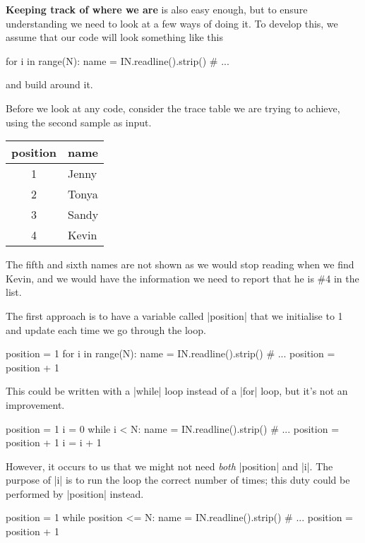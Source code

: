 \textbf{Keeping track of where we are} is also easy enough, but to ensure understanding we
need to look at a few ways of doing it. To develop this, we assume that our code will look
something like this
\begin{pythoncode}
  for i in range(N):
    name = IN.readline().strip()
    # ...
\end{pythoncode}
and build around it.

Before we look at any code, consider the trace table we are trying to achieve, using the
second sample as input.

\begin{inlinetable}
  \begin{tabular}{cl}
    \toprule
    position & name  \\
    \midrule
    1        & Jenny \\
    2        & Tonya \\
    3        & Sandy \\
    4        & Kevin \\
    \bottomrule
  \end{tabular}
\end{inlinetable}
\medskip

The fifth and sixth names are not shown as we would stop reading when we find
Kevin, and we would have the information we need to report that he is \#4 in the list.

The first approach is to have a variable called \pycode|position| that we initialise to 1
and update each time we go through the loop.
\begin{pythoncode}
  position = 1
  for i in range(N):
    name = IN.readline().strip()
    # ...
    position = position + 1
\end{pythoncode}

This could be written with a \pycode|while| loop instead of a \pycode|for| loop, but it's
not an improvement.

\begin{pythoncode}
  position = 1
  i = 0
  while i < N:
    name = IN.readline().strip()
    # ...
    position = position + 1
    i = i + 1
\end{pythoncode}

However, it occurs to us that we might not need \emph{both} \pycode|position| and
\pycode|i|. The purpose of \pycode|i| is to run the loop the correct number of times; this
duty could be performed by \pycode|position| instead.

\begin{pythoncode}
  position = 1
  while position <= N:
    name = IN.readline().strip()
    # ...
    position = position + 1
\end{pythoncode}

